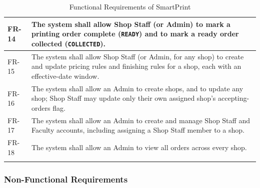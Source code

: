 \documentclass[12pt,a4paper]{report}
\begin{document}
\begin{center}
\begin{longtable}{|p{1.4cm}|p{11.9cm}|}
FR-14 & The system shall allow Shop Staff (or Admin) to mark a printing order complete (\texttt{READY}) and to mark a ready order collected (\texttt{COLLECTED}). \\ \hline
FR-15 & The system shall allow Shop Staff (or Admin, for any shop) to create and update pricing rules and finishing rules for a shop, each with an effective-date window. \\ \hline
FR-16 & The system shall allow an Admin to create shops, and to update any shop; Shop Staff may update only their own assigned shop's accepting-orders flag. \\ \hline
FR-17 & The system shall allow an Admin to create and manage Shop Staff and Faculty accounts, including assigning a Shop Staff member to a shop. \\ \hline
FR-18 & The system shall allow an Admin to view all orders across every shop. \\ \hline
\caption{Functional Requirements of SmartPrint}
\end{longtable}
\end{center}

\subsubsection*{Non-Functional Requirements}
\end{document}
